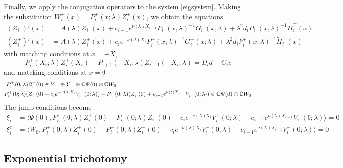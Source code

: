 \documentclass[10pt,reqno]{amsart}
\theoremstyle{plain}
\theoremstyle{definition}
\theoremstyle{remark}
\numberwithin{theorem}{section}
\numberwithin{equation}{section}
\begin{document}
Finally, we apply the conjugation operators to the system \cref{eigsystem}. Making the substitution $W_i^\pm(x) = P_i^\pm(x; \lambda) Z_i^\pm(x)$, we obtain the equations
\begin{equation}\label{systemZ}
\begin{aligned}
(Z_i^-)'(x) &= A(\lambda) Z_i^-(x) + c_{i-1} e^{\nu(\lambda)X_{i-1}}  P_i^-(x; \lambda)^{-1} G_i^-(x; \lambda) + \lambda^2 d_i P_i^-(x; \lambda)^{-1} \tilde{H}_i^-(x) \\
(Z_i^+)'(x) &= A(\lambda) Z_i^+(x) + c_i e^{-\nu(\lambda)X_i}  P_i^+(x; \lambda)^{-1} G_i^+(x; \lambda) + \lambda^2 d_i P_i^+(x; \lambda)^{-1} \tilde{H}_i^+(x)
\end{aligned}
\end{equation}
with matching conditions at $x = \pm X_i$
\begin{equation}\label{systemmiddle}
P_i^+(X_i; \lambda) Z_i^+(X_i) - P_{i+1}^-(-X_i; \lambda) Z_{i+1}^-(-X_i; \lambda) = D_i d + C_i c 
\end{equation}
and matching conditions at $x = 0$
\begin{equation}\label{systemcenter}
\begin{aligned}
P_i^\pm(0; \lambda) Z_i^\pm(0) &\in Y^+ \oplus Y^- \oplus \mathbb{C} \Psi(0) \oplus \mathbb{C} W_0 \\
P_i^+(0; \lambda)(Z_i^+(0) &+ c_i e^{-\nu(\lambda)X_i}V_i^+(0; \lambda)) - P_i^-(0; \lambda) (Z_i^-(0) + c_{i-1} e^{\nu(\lambda)X_{i-1}} V_i^-(0; \lambda)) \in \mathbb{C} \Psi(0) \oplus \mathbb{C} W_0
\end{aligned}
\end{equation}
The jump conditions become
\begin{equation}\label{jumpcondZ}
\begin{aligned}
\xi_i &= \langle \Psi(0), P_i^+(0; \lambda) Z_i^+(0) - P_i^-(0; \lambda) Z_i^-(0) + c_i e^{-\nu(\lambda)X_i}V_i^+(0; \lambda) - c_{i-1} e^{\nu(\lambda)X_{i-1}} V_i^-(0; \lambda) \rangle = 0  \\
\xi_i^c &= \langle W_0, P_i^+(0; \lambda) Z_i^+(0) - P_i^-(0; \lambda) Z_i^-(0) + c_i e^{-\nu(\lambda)X_i}V_i^+(0; \lambda) - c_{i-1} e^{\nu(\lambda)X_{i-1}} V_i^-(0; \lambda) \rangle = 0 
\end{aligned}
\end{equation}

\subsection{Exponential trichotomy}\label{sec:trichotomy}
\end{document}
